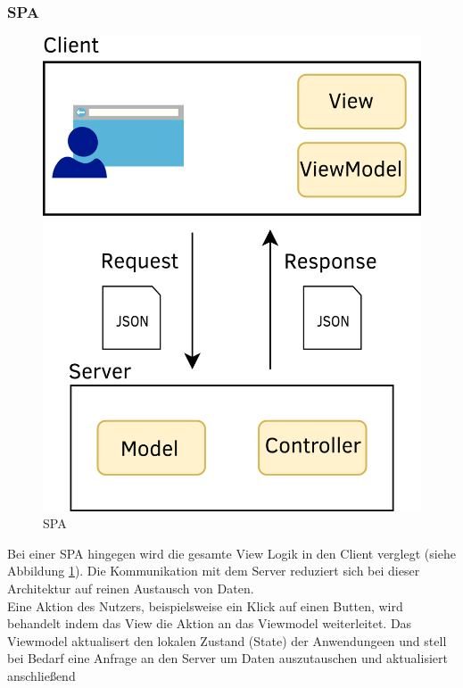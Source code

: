 \subsubsection{\acl{SPA}}
\begin{figure}
  \begin{center}
    \includegraphics[scale=1.5]{images/spa_web_app.png}
  \end{center}
  \caption{\acl{SPA}}
  \label{fig:spaweb}
\end{figure}
Bei einer \ac{SPA} hingegen wird die gesamte View Logik in den Client verglegt
(siehe Abbildung \ref{fig:spaweb}). Die Kommunikation mit dem Server reduziert
sich bei dieser Architektur auf reinen Austausch von Daten.\\
Eine Aktion des Nutzers, beispielsweise ein Klick auf einen Butten, wird behandelt indem das
View die Aktion an das Viewmodel weiterleitet. Das Viewmodel aktualisert den
lokalen Zustand (State) der Anwendungeen und stell bei Bedarf eine Anfrage an den Server um Daten auszutauschen und aktualisiert anschließend
